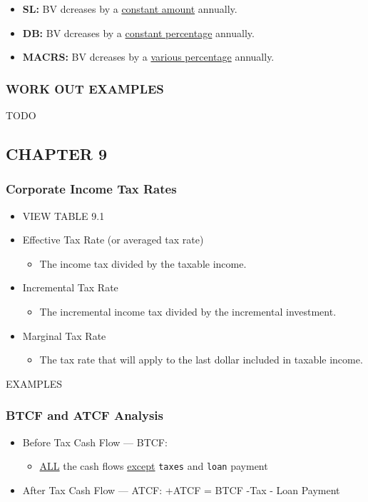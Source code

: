 \documentclass[11pt]{article}
\begin{document}
\begin{itemize}
\item \textbf{SL:} BV dcreases by a \uline{constant amount} annually.
\item \textbf{DB:} BV dcreases by a \uline{constant percentage} annually.
\item \textbf{MACRS:} BV dcreases by a \uline{various percentage} annually.
\end{itemize}

\subsubsection{WORK OUT EXAMPLES}
\label{sec:orgheadline12}
TODO
\subsection{CHAPTER 9}
\label{sec:orgheadline16}
\subsubsection{Corporate Income Tax Rates}
\label{sec:orgheadline14}
\begin{itemize}
\item VIEW TABLE 9.1

\item Effective Tax Rate (or averaged tax rate)
\begin{itemize}
\item The income tax divided by the taxable income.
\end{itemize}
\item Incremental Tax Rate
\begin{itemize}
\item The incremental income tax divided by the incremental investment.
\end{itemize}
\item Marginal Tax Rate
\begin{itemize}
\item The tax rate that will apply to the last dollar included in taxable income.
\end{itemize}
\end{itemize}

EXAMPLES

\subsubsection{BTCF and ATCF Analysis}
\label{sec:orgheadline15}
\begin{itemize}
\item Before Tax Cash Flow --- BTCF:
\begin{itemize}
\item \uline{ALL} the cash flows \uline{except} \texttt{taxes} and \texttt{loan} payment
\end{itemize}
\item After Tax Cash Flow --- ATCF:
+ATCF = BTCF -Tax - Loan Payment
\end{itemize}
\end{document}

